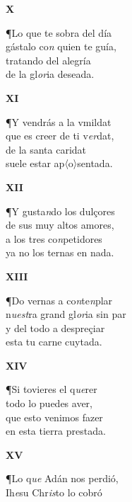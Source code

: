 \documentclass[11pt,twoside]{article}
\newcommand{\suppl}[1]{〈#1〉}
\begin{document}
\poend
\repage
%
\begin{center}
\textbf{X}
\end{center}
\postart
¶Lo que te sobra del día\\
gástalo co\emph{n} quien te guía,\\
tratando del alegría\\
de la gl\emph{or}ia deseada.\par
\poend
%
\begin{center}
\textbf{XI}
\end{center}
\postart
¶Y vendrás a la vmildat\\
que es creer de ti v\emph{er}dat,\\
de la santa caridat\\
suele estar ap\suppl{o}sentada.\par
\poend
%
\begin{center}
\textbf{XII}
\end{center}
\postart
¶Y gusta\emph{n}do los dulçores\\
de sus muy altos amores,\\
a los tres co\emph{n}petidores\\
ya no los ternas en nada.\par
\poend
%
\begin{center}
\textbf{XIII}
\end{center}
\postart
¶Do vernas a co\emph{n}te\emph{n}plar\\
n\emph{uest}ra grand gl\emph{or}ia sin par\\
y del todo a despreçiar\\
esta tu carne cuytada.\par
\poend
%
\begin{center}
\textbf{XIV}
\end{center}
\postart
¶Si tovieres el q\emph{ue}rer\\
todo lo puedes aver,\\
que esto venimos fazer\\
en esta tierra prestada.\par
\poend
%
\begin{center}
\textbf{XV}
\end{center}
\postart
¶Lo q\emph{ue} Adán nos perdió,\\
Ih\emph{e}su Chr\emph{is}to lo cobró\\
\end{document}
